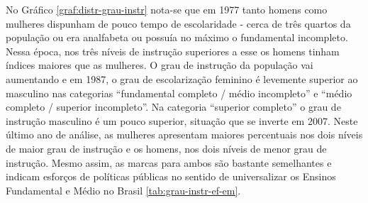 No Gráfico \ref{graf:distr-grau-instr} nota-se que em 1977 tanto homens como mulheres dispunham de pouco tempo de escolaridade - cerca de três quartos da população ou era analfabeta ou possuía no máximo o fundamental incompleto. Nessa época, nos três níveis de instrução superiores a esse os homens tinham índices maiores que as mulheres. O grau de instrução da população vai aumentando e em 1987, o grau de escolarização feminino é levemente superior ao masculino nas categorias ``fundamental completo / médio incompleto'' e ``médio completo / superior incompleto''. Na categoria ``superior completo'' o grau de instrução masculino é um pouco superior, situação que se inverte em 2007. Neste último ano de análise, as mulheres apresentam maiores percentuais nos dois níveis de maior grau de instrução e os homens, nos dois níveis de menor grau de instrução. Mesmo assim, as marcas para ambos são bastante semelhantes e indicam esforços de políticas públicas no sentido de universalizar os Ensinos Fundamental e Médio no Brasil \ref{tab:grau-instr-ef-em}.

\begin{table}[htb]
\end{table}

